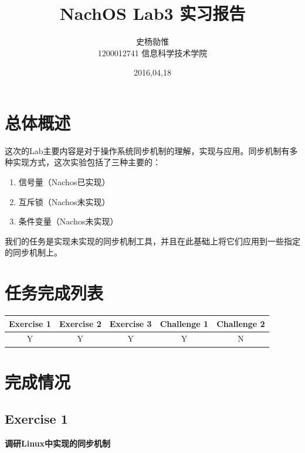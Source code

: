 \documentclass[nofonts]{ctexart}
\begin{document}
\title{%
\vspace{-30mm}\Huge NachOS Lab3 实习报告 \vspace{10mm}}
\author{%
\Large 史杨勍惟 
\\[10mm] 1200012741 信息科学技术学院}
\date{2016,04,18}

\maketitle

\newpage
\tableofcontents
\newpage

\section{总体概述}
这次的Lab主要内容是对于操作系统同步机制的理解，实现与应用。同步机制有多种实现方式，这次实验包括了三种主要的：
\begin{enumerate}
\item 信号量（Nachos已实现）
\item 互斥锁（Nachos未实现）
\item 条件变量（Nachos未实现）
\end{enumerate}
我们的任务是实现未实现的同步机制工具，并且在此基础上将它们应用到一些指定的同步机制上。

\section{任务完成列表}
\begin{table}[h]
\footnotesize
\begin{tabular}{|c|c|c|c|c|}\hline
\textbf{Exercise 1} & \textbf{Exercise 2} & \textbf{Exercise 3} & \textbf{Challenge 1} & \textbf{Challenge 2}\\\hline
Y & Y & Y & Y & N\\\hline

\end{tabular}

\end{table}
\section{完成情况}
\subsection*{Exercise 1}
\textbf{调研Linux中实现的同步机制}
\end{document}
